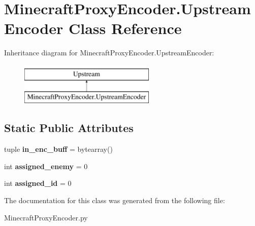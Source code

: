 \hypertarget{classMinecraftProxyEncoder_1_1UpstreamEncoder}{\section{Minecraft\-Proxy\-Encoder.\-Upstream\-Encoder Class Reference}
\label{classMinecraftProxyEncoder_1_1UpstreamEncoder}
}
Inheritance diagram for Minecraft\-Proxy\-Encoder.\-Upstream\-Encoder\-:\begin{figure}[H]
\begin{center}
\leavevmode
\includegraphics[height=2.000000cm]{classMinecraftProxyEncoder_1_1UpstreamEncoder}
\end{center}
\end{figure}
\subsection*{Static Public Attributes}
\begin{DoxyCompactItemize}
\item 
\hypertarget{classMinecraftProxyEncoder_1_1UpstreamEncoder_aaf9c962650494d59e02a19a5df0422f6}{tuple {\bfseries in\-\_\-enc\-\_\-buff} = bytearray()}\label{classMinecraftProxyEncoder_1_1UpstreamEncoder_aaf9c962650494d59e02a19a5df0422f6}

\item 
\hypertarget{classMinecraftProxyEncoder_1_1UpstreamEncoder_a8444207356e1b93746648e9796d1a7f7}{int {\bfseries assigned\-\_\-enemy} = 0}\label{classMinecraftProxyEncoder_1_1UpstreamEncoder_a8444207356e1b93746648e9796d1a7f7}

\item 
\hypertarget{classMinecraftProxyEncoder_1_1UpstreamEncoder_a011257181d74e8dceedfd403ac9594f5}{int {\bfseries assigned\-\_\-id} = 0}\label{classMinecraftProxyEncoder_1_1UpstreamEncoder_a011257181d74e8dceedfd403ac9594f5}

\end{DoxyCompactItemize}


The documentation for this class was generated from the following file\-:\begin{DoxyCompactItemize}
\item 
Minecraft\-Proxy\-Encoder.\-py\end{DoxyCompactItemize}
